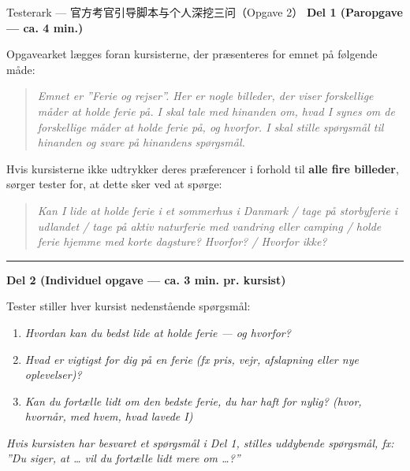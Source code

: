 \begin{grammatikbox}{Testerark --- 官方考官引导脚本与个人深挖三问（Opgave 2）}
\textbf{\color{NCDNavy}Del 1 (Paropgave --- ca. 4 min.)}

Opgavearket lægges foran kursisterne, der præsenteres for emnet på følgende måde:
\begin{quote}\itshape\small
Emnet er ”Ferie og rejser”. Her er nogle billeder, der viser forskellige måder at holde ferie på. I skal tale med hinanden om, hvad I synes om de forskellige måder at holde ferie på, og hvorfor. I skal stille spørgsmål til hinanden og svare på hinandens spørgsmål.
\end{quote}

Hvis kursisterne ikke udtrykker deres præferencer i forhold til \textbf{alle fire billeder}, sørger tester for, at dette sker ved at spørge:
\begin{quote}\itshape\small
Kan I lide at holde ferie i et sommerhus i Danmark / tage på storbyferie i udlandet / tage på aktiv naturferie med vandring eller camping / holde ferie hjemme med korte dagsture? Hvorfor? / Hvorfor ikke?
\end{quote}

\vspace{0.35em}
\hrule
\vspace{0.35em}

\textbf{\color{NCDRed}Del 2 (Individuel opgave --- ca. 3 min. pr. kursist)}

Tester stiller hver kursist nedenstående spørgsmål:
\begin{enumerate}
  \item \textit{Hvordan kan du bedst lide at holde ferie --- og hvorfor?}
  \item \textit{Hvad er vigtigst for dig på en ferie (fx pris, vejr, afslapning eller nye oplevelser)?}
  \item \textit{Kan du fortælle lidt om den bedste ferie, du har haft for nylig? (hvor, hvornår, med hvem, hvad lavede I)}
\end{enumerate}
{\small\textit{Hvis kursisten har besvaret et spørgsmål i Del 1, stilles uddybende spørgsmål, fx: ”Du siger, at \ldots{} vil du fortælle lidt mere om \ldots?”}}
\end{grammatikbox}

\clearpage
{}

